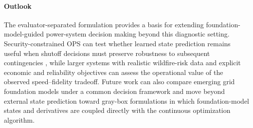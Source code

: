 \documentclass{article}
\newcommand{\fillin}[1]{\textcolor{red!70!black}{\textbf{[FILL: #1]}}}
\begin{document}
\paragraph{Outlook}
The evaluator-separated formulation provides a basis for extending
foundation-model-guided power-system decision making beyond this diagnostic
setting. Security-constrained OPS can test whether learned state prediction
remains useful when shutoff decisions must preserve robustness to subsequent
contingencies \citep{Rhodes2023SecurityCO}, while larger systems with realistic
wildfire-risk data and explicit economic and reliability objectives can assess
the operational value of the observed speed--fidelity tradeoff. Future work can
also compare emerging grid foundation models under a common decision framework
and move beyond external state prediction toward gray-box formulations in which
foundation-model states and derivatives are coupled directly with the
continuous optimization algorithm.





\end{document}
